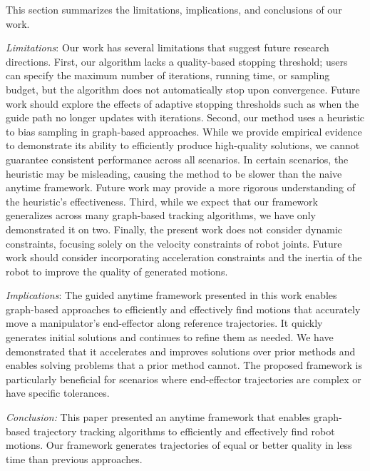 This section summarizes the limitations, implications, and conclusions of our work.

\textit{Limitations}:
Our work has several limitations that suggest future research directions. First, our algorithm lacks a quality-based stopping threshold; users can specify the maximum number of iterations, running time, or sampling budget, but the algorithm does not automatically stop upon convergence. Future work should explore the effects of adaptive stopping thresholds such as when the guide path no longer updates with iterations. 
Second, our method uses a heuristic to bias sampling in graph-based approaches. While we provide empirical evidence to demonstrate its ability to efficiently produce high-quality solutions, we cannot guarantee consistent performance across all scenarios. In certain scenarios, the heuristic may be misleading, causing the method to be slower than the naive anytime framework. Future work may provide a more rigorous understanding of the heuristic's effectiveness.
Third, while we expect that our framework generalizes across many graph-based tracking algorithms, we have only demonstrated it on two. 
Finally, the present work does not consider dynamic constraints, focusing solely on the velocity constraints of robot joints. Future work should consider incorporating acceleration constraints and the inertia of the robot to improve the quality of generated motions.

\textit{Implications}:
The guided anytime framework presented in this work enables graph-based approaches to efficiently and effectively find motions that accurately move a manipulator's end-effector along reference trajectories. It quickly generates initial solutions and continues to refine them as needed.
We have demonstrated that it accelerates and improves solutions over prior methods and enables solving problems that a prior method cannot.
The proposed framework is particularly beneficial for scenarios where end-effector trajectories are complex or have specific tolerances. 

\textit{Conclusion:} This paper presented an anytime framework that enables graph-based trajectory tracking algorithms to efficiently and effectively find robot motions. Our framework generates trajectories of equal or better quality in less time than previous approaches. 
